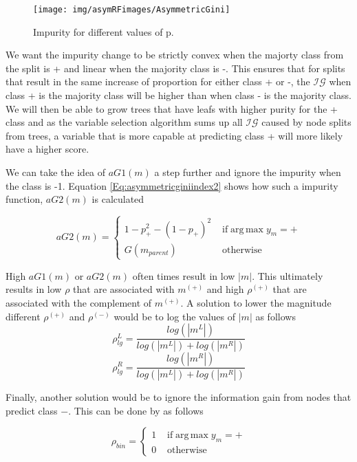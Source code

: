 \documentclass[twoside,11pt]{article}
\begin{document}
\begin{figure}
 \centering
\texttt{[image: img/asymRFimages/AsymmetricGini]}\\
 \caption{Impurity for different values of p.}
 \label{Fig:Quantile Regression}
\end{figure}

We want the impurity change to be strictly convex when the majorty class from the split is + and linear when the majority class is -. This ensures that for splits that result in the same increase of proportion for either class + or -, the $\mathcal{IG}$ when class + is the majority class will be higher than when class - is the majority class. We will then be able to grow trees that have leafs with higher purity for the + class and as the variable selection algorithm sums up all $\mathcal{IG}$ caused by node splits from trees, a variable that is more capable at predicting class + will more likely have a higher score. 

We can take the idea of $aG1(m)$ a step further and ignore the impurity when the class is -1. Equation \ref{Eq:asymmetricginiindex2} shows how such a impurity function, $aG2(m)$ is calculated

\begin{equation}\label{Eq:asymmetricginiindex2}
aG2(m)=
\begin{cases} 1-p_{+}^2-(1-p_{+})^2 & \text{ if} \operatorname{arg\,max} y_m = + 
\\ G(m_{parent})&\text{ otherwise}
\end{cases}
\end{equation}

High $aG1(m)$ or $aG2(m)$ often times result in low $|m|$. This ultimately results in low $\rho$ that are associated with $m^{(+)}$ and high $\rho^{(+)}$ that are associated with the complement of $m^{(+)}$. A solution to lower the magnitude different $\rho^{(+)}$  and $\rho^{(-)}$ would be to log the values of $|m|$ as follows
\begin{equation}\label{eqn:rho_log}
	\rho_{lg}^L = \frac{log(|m^L|)}{log(|m^L|)+log(|m^R|)}
\end{equation}
\begin{equation}
	\rho_{lg}^R = \frac{log(|m^R|)}{log(|m^L|)+log(|m^R|)}
\end{equation}


Finally, another solution would be to ignore the information gain from nodes that predict class $-$. This can be done by as follows

\begin{equation}
	\rho_{bin} = \begin{cases} 1 & \text{ if} \operatorname{arg\,max} y_m = + 
\\ 0&\text{ otherwise}
\end{cases}
\end{equation}
\end{document}
